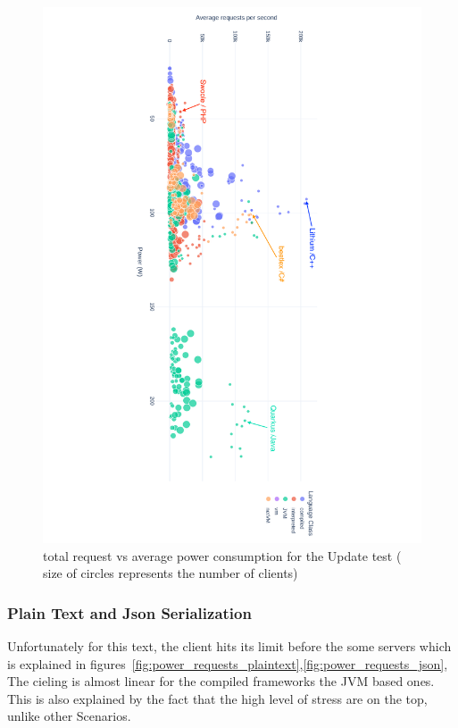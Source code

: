 \begin{figure}[hbt]
    \caption{total request vs average power consumption for the Update test ( size of circles represents the number of clients) }
    \label{fig:power_requests_update}
    \includegraphics[width=
        \columnwidth,angle=9
        0]{imgs/power_requests_update}

\end{figure}

\subsubsection{Plain Text and Json Serialization}
Unfortunately for this text, the client hits its limit before the some servers which is explained in figures~\ref{fig:power_requests_plaintext},\ref{fig:power_requests_json}, The cieling is almost linear for the compiled frameworks the JVM based ones. This is also explained by the fact that the high level of stress are on the top, unlike other Scenarios.


